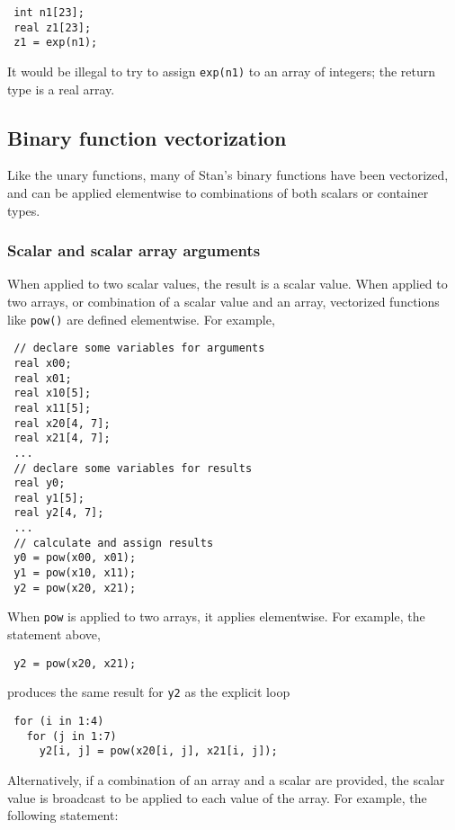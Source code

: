 \documentclass[
  10pt,
]{book}
\begin{document}
\begin{verbatim}
 int n1[23];
 real z1[23];
 z1 = exp(n1);
\end{verbatim}

It would be illegal to try to assign \texttt{exp(n1)} to an array of
integers; the return type is a real array.

\hypertarget{binary-function-vectorization}{%
\subsection{Binary function vectorization}\label{binary-function-vectorization}}

Like the unary functions, many of Stan's binary functions have been
vectorized, and can be applied elementwise to combinations of both
scalars or container types.

\hypertarget{scalar-and-scalar-array-arguments}{%
\subsubsection{Scalar and scalar array arguments}\label{scalar-and-scalar-array-arguments}}

When applied to two scalar values, the result is a scalar value. When
applied to two arrays, or combination of a scalar value and an array,
vectorized functions like \texttt{pow()} are defined elementwise. For example,

\begin{verbatim}
 // declare some variables for arguments
 real x00;
 real x01;
 real x10[5];
 real x11[5];
 real x20[4, 7];
 real x21[4, 7];
 ...
 // declare some variables for results
 real y0;
 real y1[5];
 real y2[4, 7];
 ...
 // calculate and assign results
 y0 = pow(x00, x01);
 y1 = pow(x10, x11);
 y2 = pow(x20, x21);
\end{verbatim}

When \texttt{pow} is applied to two arrays, it applies elementwise. For
example, the statement above,

\begin{verbatim}
 y2 = pow(x20, x21);
\end{verbatim}

produces the same result for \texttt{y2} as the explicit loop

\begin{verbatim}
 for (i in 1:4)
   for (j in 1:7)
     y2[i, j] = pow(x20[i, j], x21[i, j]);
\end{verbatim}

Alternatively, if a combination of an array and a scalar are
provided, the scalar value is broadcast to be applied to each
value of the array. For example, the following statement:
\end{document}
